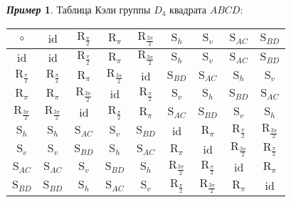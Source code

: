 \documentclass[a4paper, 14pt]{extarticle}
\newcommand{\n}{\par}
\newcommand{\id}{\mathrm{id}}
\newcommand{\Rot}{\mathrm{R}}
\newcommand{\Sym}{\mathrm{S}}
\theoremstyle{definition}
\newtheorem*{exmpl*}{\textit{Пример}}
\theoremstyle{plain}
\numberwithin{theorem}{section}
\numberwithin{definition}{section}
\numberwithin{statement}{section}
\numberwithin{lemma}{section}
\numberwithin{consequence}{section}
\begin{document}
		\begin{exmpl*}
			Таблица Кэли группы $D_4$ квадрата $ABCD{:}$
			\begin{center}
				\begin{tabular}{c|c|c|c|c|c|c|c|c}
					$\circ$ & $\id$ & $\Rot_{\frac{\pi}{2}}$ & $\Rot_{\pi}$ & $\Rot_{\frac{3\pi}{2}}$ & 
					$\Sym_h$ &
					$\Sym_v$ &
					$\Sym_{AC}$ &
					$\Sym_{BD}$ \\
					\hline
					$\id$ & $\id$ & $\Rot_{\frac{\pi}{2}}$ & $\Rot_{\pi}$ & $\Rot_{\frac{3\pi}{2}}$ & 
					$\Sym_h$ &
					$\Sym_v$ &
					$\Sym_{AC}$ &
					$\Sym_{BD}$ \\
					\hline
					$\Rot_{\frac{\pi}{2}}$ & $\Rot_{\frac{\pi}{2}}$ & $\Rot_{\pi}$ & $\Rot_\frac{3\pi}{2}$ & $\id$ & $\Sym_{BD}$ & $\Sym_{AC}$ & $\Sym_h$ & $\Sym_v$ \\
					\hline
					$\Rot_{\pi}$ & $\Rot_{\pi}$ & $\Rot_\frac{3\pi}{2}$ & $\id$ & $\Rot_\frac{\pi}{2}$ & $\Sym_v$ & $\Sym_h$ & $\Sym_{BD}$ & $\Sym_{AC}$ \\ \hline
					$\Rot_\frac{3\pi}{2}$ & $\Rot_\frac{3\pi}{2}$ & $\id$ & $\Rot_\frac{\pi}{2}$ & $\Rot_{\pi}$ & $\Sym_{AC}$ & $\Sym_{BD}$ & $\Sym_v$ & $\Sym_h$ \\
					\hline
					$\Sym_h$ & $\Sym_h$ & $\Sym_{AC}$ & $\Sym_v$ & $\Sym_{BD}$ & $\id$ & $\Rot_{\pi}$ & $\Rot_\frac{\pi}{2}$ & $\Rot_\frac{3\pi}{2}$
					\\
					\hline
					$\Sym_v$ & $\Sym_v$ & $\Sym_{BD}$ & $\Sym_h$ & $\Sym_{AC}$ & $\Rot_{\pi}$ & $\id$ & $\Rot_\frac{3\pi}{2}$ & $\Rot_\frac{\pi}{2}$
					\\
					\hline
					$\Sym_{AC}$ & $\Sym_{AC}$ & $\Sym_v$ & $\Sym_{BD}$ & $\Sym_h$ & $\Rot_\frac{3\pi}{2}$ & $\Rot_\frac{\pi}{2}$ & $\id$ & $\Rot_{\pi}$
					\\
					\hline
					$\Sym_{BD}$ & $\Sym_{BD}$ & $\Sym_h$ & $\Sym_{AC}$ & $\Sym_v$ & $\Rot_\frac{\pi}{2}$ & $\Rot_\frac{3\pi}{2}$ & $\Rot_{\pi}$ & $\id$\\
				\end{tabular}
			\end{center} \n
		\end{exmpl*}
		\newpage
\end{document}
